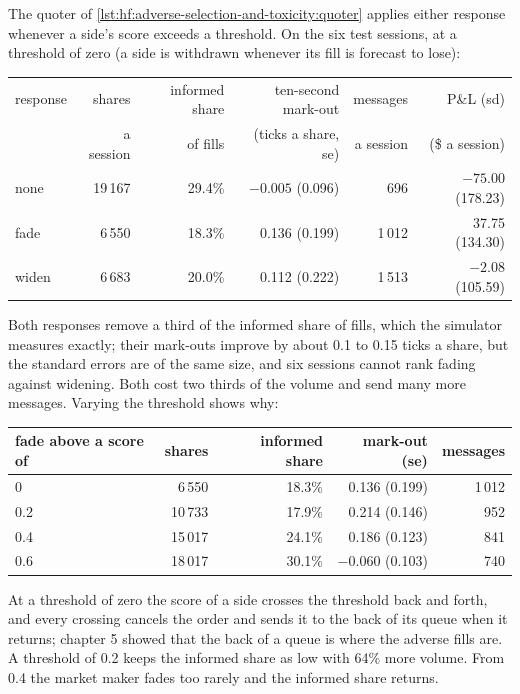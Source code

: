 The quoter of \cref{lst:hf:adverse-selection-and-toxicity:quoter} applies either response whenever a side's score exceeds a threshold. On the six
test sessions, at a threshold of zero (a side is withdrawn whenever its fill is forecast to lose):

\begin{center}
\small
\begin{tabular}{@{}lrrrrr@{}}
\toprule
response & shares & informed share & ten-second mark-out & messages & P\&L (sd)\\
& a session & of fills & (ticks a share, se) & a session & (\$ a session)\\
\midrule
none & 19\,167 & 29.4\% & $-0.005$ (0.096) & 696 & $-75.00$ (178.23)\\
fade & 6\,550 & 18.3\% & 0.136 (0.199) & 1\,012 & 37.75 (134.30)\\
widen & 6\,683 & 20.0\% & 0.112 (0.222) & 1\,513 & $-2.08$ (105.59)\\
\bottomrule
\end{tabular}
\end{center}

Both responses remove a third of the informed share of fills, which the simulator measures exactly; their mark-outs improve by about 0.1 to 0.15
ticks a share, but the standard errors are of the same size, and six sessions cannot rank fading against widening. Both cost two thirds of the
volume and send many more messages. Varying the threshold shows why:

\begin{center}
\small
\begin{tabular}{@{}lrrrr@{}}
\toprule
fade above a score of & shares & informed share & mark-out (se) & messages\\
\midrule
0 & 6\,550 & 18.3\% & 0.136 (0.199) & 1\,012\\
0.2 & 10\,733 & 17.9\% & 0.214 (0.146) & 952\\
0.4 & 15\,017 & 24.1\% & 0.186 (0.123) & 841\\
0.6 & 18\,017 & 30.1\% & $-0.060$ (0.103) & 740\\
\bottomrule
\end{tabular}
\end{center}

At a threshold of zero the score of a side crosses the threshold back and forth, and every crossing cancels the order and sends it to the back of
its queue when it returns; chapter 5 showed that the back of a queue is where the adverse fills are. A threshold of 0.2 keeps the informed share as
low with 64\% more volume. From 0.4 the market maker fades too rarely and the informed share returns.


